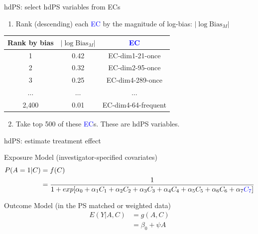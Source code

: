 \documentclass[
  ignorenonframetext,
  aspectratio=169]{beamer}
\providecommand{\tightlist}{%
  \setlength{\itemsep}{0pt}\setlength{\parskip}{0pt}}
\begin{document}
\begin{frame}{hdPS: select hdPS variables from ECs}
\protect\hypertarget{hdps-select-hdps-variables-from-ecs}{}
\begin{enumerate}
\tightlist
\item
  Rank (descending) each \textcolor{blue}{EC} by the magnitude of
  log-bias: \(|\log{\text{Bias}_M}|\)
\end{enumerate}

\begin{center}
\begin{tabular}{ c c c }
 \toprule
Rank by bias & $|\log{\text{Bias}_M}|$ & \textcolor{blue}{EC} \\ 
 \midrule
1 & 0.42 & EC-dim1-21-once\\
2 & 0.32 & EC-dim2-95-once\\
3 & 0.25 & EC-dim4-289-once\\
$\ldots$ &  $\ldots$ & $\ldots$ \\
2,400 & 0.01 & EC-dim4-64-frequent\\
 \bottomrule
\end{tabular}
\end{center}

\begin{enumerate}
\setcounter{enumi}{1}
\tightlist
\item
  Take top 500 of these \textcolor{blue}{EC}s. These are hdPS variables.
\end{enumerate}
\end{frame}

\begin{frame}{hdPS: estimate treatment effect}
\protect\hypertarget{hdps-estimate-treatment-effect}{}
\begin{block}{Exposure Model (investigator-specified covariates)}
\protect\hypertarget{exposure-model-investigator-specified-covariates}{}
\begin{equation}
\begin{aligned}
P(A=1|C) &= f(C) \\
        &= \frac{1}{1+exp[\alpha_0 + \alpha_1 C_1 + \alpha_2 C_2 + \alpha_3 C_3 + \alpha_4 C_4 + \alpha_5 C_5 + \alpha_6 C_6 + \alpha_7 \textcolor{blue}{C_7} ]}\nonumber
\end{aligned}
\end{equation}
\end{block}

\begin{block}{Outcome Model (in the PS matched or weighted data)}
\protect\hypertarget{outcome-model-in-the-ps-matched-or-weighted-data}{}
\begin{equation}
\begin{aligned}
E(Y|A,C) &= g(A,C)\\
&= \beta_0 + \psi A \nonumber
\end{aligned}
\end{equation}
\end{block}
\end{frame}
\end{document}
